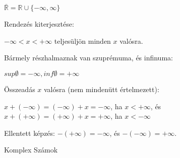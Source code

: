 \begin{frame}
\begin{tcolorbox}[title={Def.: Bővített valós számok (?)}]
  $\overline{\mathbb{R}} = \mathbb{R} \cup \{ -{\infty}, {\infty}\}$\\
  \mbigskip

  Rendezés kiterjesztése:\\
  \mmedskip
  
  $-{\infty} < x < +{\infty}$ teljesüljön minden $x$ valósra.\\
  \msmallskip
  
  Bármely részhalmaznak van szuprémuma, és infinuma:\\
  \msmallskip
  
  $sup{\emptyset} = -{\infty}, inf{\emptyset} = +{\infty}$\\
  \mmedskip

  Összeadás $x$ valósra (nem mindenütt értelmezett):\\
  \msmallskip
  
  $x + (-{\infty}) = (-{\infty}) + x = -{\infty}$, ha $x < +{\infty}$, és $x + (+{\infty}) = (+{\infty}) + x = +{\infty}$, ha $x < -{\infty}$\\
  \mmedskip

  Ellentett képzés: $-(+{\infty}) = -{\infty}$, és $-(-{\infty}) = +{\infty}$.
\end{tcolorbox}
\end{frame}


\begin{frame}
\begin{tcolorbox}
{\Huge Komplex Számok}
\end{tcolorbox}
\end{frame}

